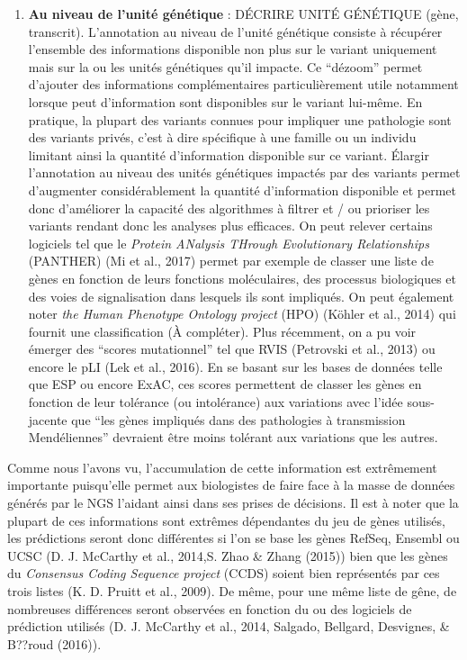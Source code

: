\documentclass[12pt,twoside]{reedthesis}
\providecommand{\tightlist}{%
  \setlength{\itemsep}{0pt}\setlength{\parskip}{0pt}}
\theoremstyle{definition}
\theoremstyle{definition}
\theoremstyle{remark}
\begin{document}
  \begin{enumerate}
  \def\labelenumi{\arabic{enumi}.}
  \setcounter{enumi}{1}
  \tightlist
  \item
    \textbf{Au niveau de l'unité génétique} : DÉCRIRE UNITÉ GÉNÉTIQUE
    (gène, transcrit). L'annotation au niveau de l'unité génétique
    consiste à récupérer l'ensemble des informations disponible non plus
    sur le variant uniquement mais sur la ou les unités génétiques qu'il
    impacte. Ce ``dézoom'' permet d'ajouter des informations
    complémentaires particulièrement utile notamment lorsque peut
    d'information sont disponibles sur le variant lui-même. En pratique,
    la plupart des variants connues pour impliquer une pathologie sont des
    variants privés, c'est à dire spécifique à une famille ou un individu
    limitant ainsi la quantité d'information disponible sur ce variant.
    Élargir l'annotation au niveau des unités génétiques impactés par des
    variants permet d'augmenter considérablement la quantité d'information
    disponible et permet donc d'améliorer la capacité des algorithmes à
    filtrer et / ou prioriser les variants rendant donc les analyses plus
    efficaces. On peut relever certains logiciels tel que le \emph{Protein
    ANalysis THrough Evolutionary Relationships} (PANTHER) (Mi et al.,
    2017) permet par exemple de classer une liste de gènes en fonction de
    leurs fonctions moléculaires, des processus biologiques et des voies
    de signalisation dans lesquels ils sont impliqués. On peut également
    noter \emph{the Human Phenotype Ontology project} (HPO) (Köhler et
    al., 2014) qui fournit une classification (À compléter). Plus
    récemment, on a pu voir émerger des ``scores mutationnel'' tel que
    RVIS (Petrovski et al., 2013) ou encore le pLI (Lek et al., 2016). En
    se basant sur les bases de données telle que ESP ou encore ExAC, ces
    scores permettent de classer les gènes en fonction de leur tolérance
    (ou intolérance) aux variations avec l'idée sous-jacente que ``les
    gènes impliqués dans des pathologies à transmission Mendéliennes''
    devraient être moins tolérant aux variations que les autres.
  \end{enumerate}
  
  Comme nous l'avons vu, l'accumulation de cette information est
  extrêmement importante puisqu'elle permet aux biologistes de faire face
  à la masse de données générés par le NGS l'aidant ainsi dans ses prises
  de décisions. Il est à noter que la plupart de ces informations sont
  extrêmes dépendantes du jeu de gènes utilisés, les prédictions seront
  donc différentes si l'on se base les gènes RefSeq, Ensembl ou UCSC (D.
  J. McCarthy et al., 2014,S. Zhao \& Zhang (2015)) bien que les gènes du
  \emph{Consensus Coding Sequence project} (CCDS) soient bien représentés
  par ces trois listes (K. D. Pruitt et al., 2009). De même, pour une même
  liste de gêne, de nombreuses différences seront observées en fonction du
  ou des logiciels de prédiction utilisés (D. J. McCarthy et al., 2014,
  Salgado, Bellgard, Desvignes, \& B??roud (2016)).
  
\end{document}

